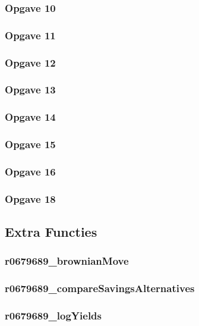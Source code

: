 \documentclass[11pt, a4paper, titlepage, openright]{article}
\begin{document}
		\subsubsection{Opgave 10}
			
		\bigskip
		\subsubsection{Opgave 11}
			
		\bigskip
		\subsubsection{Opgave 12}
			
		\bigskip
		\subsubsection{Opgave 13}
			
		\bigskip
		\subsubsection{Opgave 14}
			
		\bigskip
		\subsubsection{Opgave 15}
			
		\bigskip
		\subsubsection{Opgave 16}
			
		\bigskip
		\subsubsection{Opgave 18}
			
		\bigskip
		
	\subsection{Extra Functies}
		\subsubsection{r0679689\_brownianMove}
			
		\bigskip
		\subsubsection{r0679689\_compareSavingsAlternatives}
			
		\bigskip
		\subsubsection{r0679689\_logYields}
			
		\bigskip
		
\end{document}
